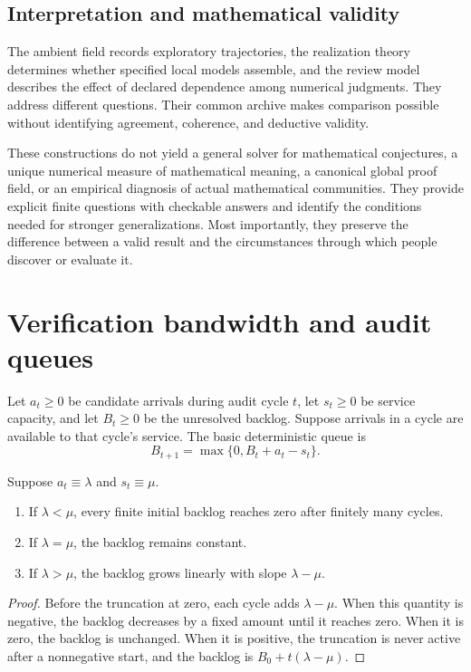 \subsection{Interpretation and mathematical validity}

The ambient field records exploratory trajectories, the realization theory determines whether specified local models assemble, and the review model describes the effect of declared dependence among numerical judgments. They address different questions. Their common archive makes comparison possible without identifying agreement, coherence, and deductive validity.

These constructions do not yield a general solver for mathematical conjectures, a unique numerical measure of mathematical meaning, a canonical global proof field, or an empirical diagnosis of actual mathematical communities. They provide explicit finite questions with checkable answers and identify the conditions needed for stronger generalizations. Most importantly, they preserve the difference between a valid result and the circumstances through which people discover or evaluate it.



\section{Verification bandwidth and audit queues}
\label{PPT:sec:old18}

Let $a_t\geq0$ be candidate arrivals during audit cycle $t$, let $s_t\geq0$ be service capacity, and let $B_t\geq0$ be the unresolved backlog. Suppose arrivals in a cycle are available to that cycle's service. The basic deterministic queue is
\[
B_{t+1}=\max\{0,B_t+a_t-s_t\}.
\]

\begin{PPTtheorem}
\label{PPT:res:18:1}
\label{PPT:thm:audit-rates}
Suppose $a_t\equiv\lambda$ and $s_t\equiv\mu$.
\begin{enumerate}[label=\textup{(\roman*)}]
\item If $\lambda<\mu$, every finite initial backlog reaches zero after finitely many cycles.
\item If $\lambda=\mu$, the backlog remains constant.
\item If $\lambda>\mu$, the backlog grows linearly with slope $\lambda-\mu$.
\end{enumerate}
\end{PPTtheorem}

\begin{proof}
Before the truncation at zero, each cycle adds $\lambda-\mu$. When this quantity is negative, the backlog decreases by a fixed amount until it reaches zero. When it is zero, the backlog is unchanged. When it is positive, the truncation is never active after a nonnegative start, and the backlog is $B_0+t(\lambda-\mu)$.
\end{proof}

